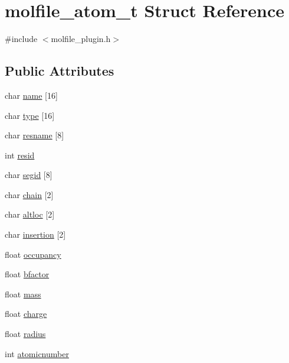 \hypertarget{structmolfile__atom__t}{\section{molfile\-\_\-atom\-\_\-t \-Struct \-Reference}
\label{structmolfile__atom__t}
}


{\ttfamily \#include $<$molfile\-\_\-plugin.\-h$>$}

\subsection*{\-Public \-Attributes}
\begin{DoxyCompactItemize}
\item 
char \hyperlink{structmolfile__atom__t_a34d5b21ed78a1253bf667bca88432ec0}{name} \mbox{[}16\mbox{]}
\item 
char \hyperlink{structmolfile__atom__t_a9bc13f9db0e6b5a3267391b183d04d3d}{type} \mbox{[}16\mbox{]}
\item 
char \hyperlink{structmolfile__atom__t_a8efb6a7bcdb236f2099f999151c610a5}{resname} \mbox{[}8\mbox{]}
\item 
int \hyperlink{structmolfile__atom__t_ad80e5df65fedf1ef6d61f3846ba896fa}{resid}
\item 
char \hyperlink{structmolfile__atom__t_af5ffd7e65b937a913d23ebc75d5954b1}{segid} \mbox{[}8\mbox{]}
\item 
char \hyperlink{structmolfile__atom__t_a4788ad19cb3c8de63f4d3caf25b7469a}{chain} \mbox{[}2\mbox{]}
\item 
char \hyperlink{structmolfile__atom__t_a1073f97a075a5a512751cb321eb1a35f}{altloc} \mbox{[}2\mbox{]}
\item 
char \hyperlink{structmolfile__atom__t_acfa3d94213fe2cd6bddf115a1e587e80}{insertion} \mbox{[}2\mbox{]}
\item 
float \hyperlink{structmolfile__atom__t_af2dca5440e0aa9b9161f3135fc5a873d}{occupancy}
\item 
float \hyperlink{structmolfile__atom__t_a7255519f1dc407eacebf3a74c6282ae9}{bfactor}
\item 
float \hyperlink{structmolfile__atom__t_ac061a678359fcb37f75f330e485b9926}{mass}
\item 
float \hyperlink{structmolfile__atom__t_ab0d78f9de3ebe2c30594d025761eb77d}{charge}
\item 
float \hyperlink{structmolfile__atom__t_ac6ad7768d0b95289f48bac4e5cfb556c}{radius}
\item 
int \hyperlink{structmolfile__atom__t_a2c7410479520c3abf66a472974c620f6}{atomicnumber}
\end{DoxyCompactItemize}


